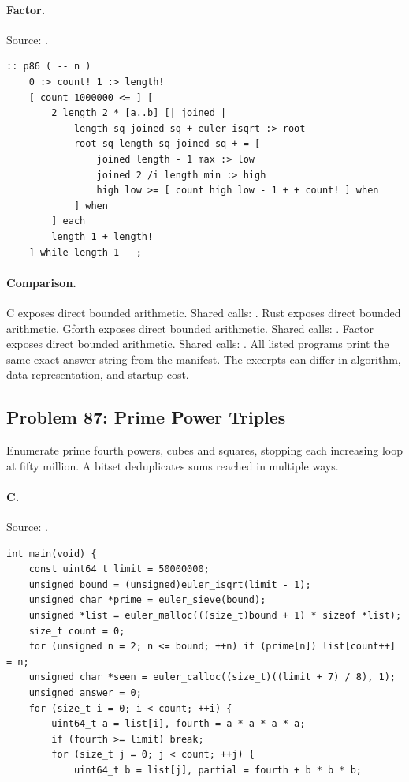 \paragraph{Factor.} Source: .
\begin{lstlisting}
:: p86 ( -- n )
    0 :> count! 1 :> length!
    [ count 1000000 <= ] [
        2 length 2 * [a..b] [| joined |
            length sq joined sq + euler-isqrt :> root
            root sq length sq joined sq + = [
                joined length - 1 max :> low
                joined 2 /i length min :> high
                high low >= [ count high low - 1 + + count! ] when
            ] when
        ] each
        length 1 + length!
    ] while length 1 - ;
\end{lstlisting}

\paragraph{Comparison.}
C exposes direct bounded arithmetic. Shared calls: \texttt{}. Rust exposes direct bounded arithmetic. Gforth exposes direct bounded arithmetic. Shared calls: \texttt{}. Factor exposes direct bounded arithmetic. Shared calls: \texttt{}.
All listed programs print the same exact answer string from the manifest. The excerpts can differ in algorithm, data representation, and startup cost.

\subsection{Problem 87: Prime Power Triples}
\label{walkthrough:p87}
Enumerate prime fourth powers, cubes and squares, stopping each increasing loop at fifty million. A bitset deduplicates sums reached in multiple ways.

\paragraph{C.} Source: .
\begin{lstlisting}
int main(void) {
    const uint64_t limit = 50000000;
    unsigned bound = (unsigned)euler_isqrt(limit - 1);
    unsigned char *prime = euler_sieve(bound);
    unsigned *list = euler_malloc(((size_t)bound + 1) * sizeof *list);
    size_t count = 0;
    for (unsigned n = 2; n <= bound; ++n) if (prime[n]) list[count++] = n;
    unsigned char *seen = euler_calloc((size_t)((limit + 7) / 8), 1);
    unsigned answer = 0;
    for (size_t i = 0; i < count; ++i) {
        uint64_t a = list[i], fourth = a * a * a * a;
        if (fourth >= limit) break;
        for (size_t j = 0; j < count; ++j) {
            uint64_t b = list[j], partial = fourth + b * b * b;
\end{lstlisting}

